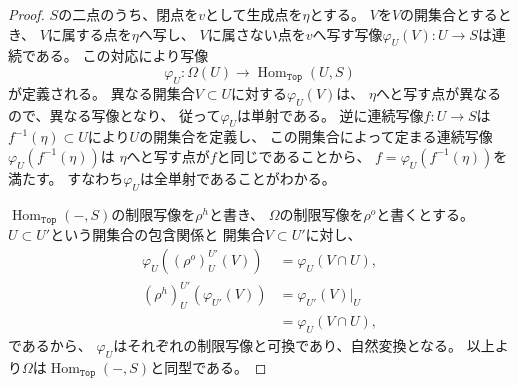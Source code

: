 \documentclass[uplatex]{jsarticle}
\theoremstyle{definition}
\DeclareMathOperator{\Hom}{Hom}
\DeclareMathOperator{\sfTop}{\mathtt{Top}}
\begin{document}
\begin{proof}
  \(S\)の二点のうち、閉点を\(v\)として生成点を\(\eta\)とする。
  \(V\)を\(V\)の開集合とするとき、
  \(V\)に属する点を\(\eta\)へ写し、
  \(V\)に属さない点を\(v\)へ写す写像\(\varphi_U(V):U\to S\)は連続である。
  この対応により写像
  \[
  \varphi_U: \Omega(U) \to \Hom_{\sfTop}(U,S)
  \]
  が定義される。
  異なる開集合\(V\subset U\)に対する\(\varphi_U(V)\)は、
  \(\eta\)へと写す点が異なるので、異なる写像となり、
  従って\(\varphi_U\)は単射である。
  逆に連続写像\(f:U\to S\)は\(f^{-1}(\eta)\subset U\)により\(U\)の開集合を定義し、
  この開集合によって定まる連続写像\(\varphi_U(f^{-1}(\eta))\)は
  \(\eta\)へと写す点が\(f\)と同じであることから、
  \(f=\varphi_U(f^{-1}(\eta))\)を満たす。
  すなわち\(\varphi_U\)は全単射であることがわかる。

  \(\Hom_{\sfTop}(-,S)\)の制限写像を\(\rho^h\)と書き、
  \(\Omega\)の制限写像を\(\rho^o\)と書くとする。
  \(U\subset U'\)という開集合の包含関係と
  開集合\(V\subset U'\)に対し、
  \begin{align*}
    \varphi_U((\rho^o)_{U}^{U'}(V))
    &= \varphi_U(V\cap U), \\
    (\rho^h)_U^{U'}(\varphi_{U'}(V))
    &= \varphi_{U'}(V)|_U \\
    &= \varphi_U(V\cap U),
  \end{align*}
  であるから、
  \(\varphi_U\)はそれぞれの制限写像と可換であり、自然変換となる。
  以上より\(\Omega\)は\(\Hom_{\sfTop}(-,S)\)と同型である。
\end{proof}
\end{document}

